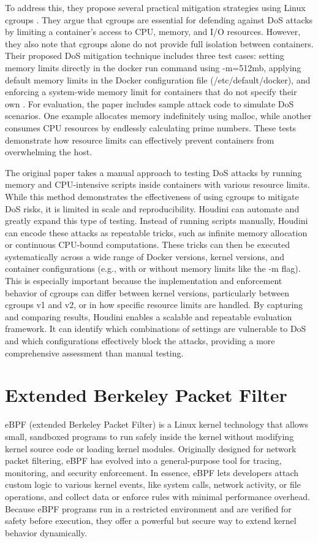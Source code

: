 \documentclass[12pt]{report}
\begin{document}
\begin{doublespace}
To address this, they propose several practical mitigation strategies using Linux cgroups \cite{chelladhurai2016securing}. They argue that cgroups are essential for defending against DoS attacks by limiting a container’s access to CPU, memory, and I/O resources. However, they also note that cgroups alone do not provide full isolation between containers. Their proposed DoS mitigation technique includes three test cases: setting memory limits directly in the docker run command using -m=512mb, applying default memory limits in the Docker configuration file (/etc/default/docker), and enforcing a system-wide memory limit for containers that do not specify their own \cite{chelladhurai2016securing}. For evaluation, the paper includes sample attack code to simulate DoS scenarios. One example allocates memory indefinitely using malloc, while another consumes CPU resources by endlessly calculating prime numbers. These tests demonstrate how resource limits can effectively prevent containers from overwhelming the host.

The original paper takes a manual approach to testing DoS attacks by running memory and CPU-intensive scripts inside containers with various resource limits. While this method demonstrates the effectiveness of using cgroups to mitigate DoS risks, it is limited in scale and reproducibility. Houdini can automate and greatly expand this type of testing. Instead of running scripts manually, Houdini can encode these attacks as repeatable tricks, such as infinite memory allocation or continuous CPU-bound computations. These tricks can then be executed systematically across a wide range of Docker versions, kernel versions, and container configurations (e.g., with or without memory limits like the -m flag). This is especially important because the implementation and enforcement behavior of cgroups can differ between kernel versions, particularly between cgroups v1 and v2, or in how specific resource limits are handled. By capturing and comparing results, Houdini enables a scalable and repeatable evaluation framework. It can identify which combinations of settings are vulnerable to DoS and which configurations effectively block the attacks, providing a more comprehensive assessment than manual testing.

\section{Extended Berkeley Packet Filter}


eBPF (extended Berkeley Packet Filter) is a Linux kernel technology that allows small, sandboxed programs to run safely inside the kernel without modifying kernel source code or loading kernel modules. Originally designed for network packet filtering, eBPF has evolved into a general-purpose tool for tracing, monitoring, and security enforcement. In essence, eBPF lets developers attach custom logic to various kernel events, like system calls, network activity, or file operations, and collect data or enforce rules with minimal performance overhead. Because eBPF programs run in a restricted environment and are verified for safety before execution, they offer a powerful but secure way to extend kernel behavior dynamically.



\end{doublespace}
\end{document}
